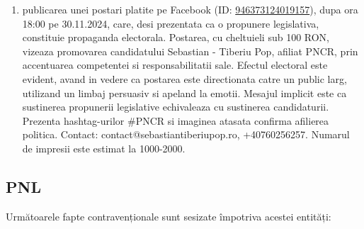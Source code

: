 \documentclass[a4paper,12pt]{article}
\begin{document}
\begin{enumerate}[leftmargin=*, label=\arabic*.)]
    \item publicarea unei postari platite pe Facebook (ID: \href{https://www.facebook.com/ads/library/?id=946373124019157}{946373124019157}), dupa ora 18:00 pe 30.11.2024, care, desi prezentata ca o propunere legislativa, constituie propaganda electorala. Postarea, cu cheltuieli sub 100 RON, vizeaza promovarea candidatului Sebastian - Tiberiu Pop, afiliat PNCR, prin accentuarea competentei si responsabilitatii sale.  Efectul electoral este evident, avand in vedere ca postarea este directionata catre un public larg, utilizand un limbaj persuasiv si apeland la emotii.  Mesajul implicit este ca sustinerea propunerii legislative echivaleaza cu sustinerea candidaturii.  Prezenta hashtag-urilor \#PNCR si imaginea atasata confirma afilierea politica.  Contact: contact@sebastiantiberiupop.ro, +40760256257.  Numarul de impresii este estimat la 1000-2000.
\end{enumerate}

\vspace{0.5cm}

\subsection{PNL}
Următoarele fapte contravenționale sunt sesizate împotriva acestei entități:
\end{document}
